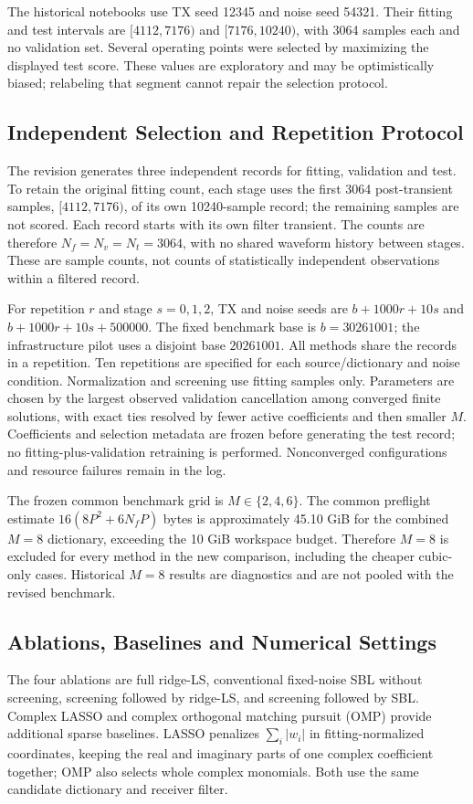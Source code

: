 \documentclass[conference]{IEEEtran}
\begin{document}
The historical notebooks use TX seed 12345 and noise seed 54321. Their fitting and test intervals are $[4112,7176)$ and $[7176,10240)$, with 3064 samples each and no validation set. Several operating points were selected by maximizing the displayed test score. These values are exploratory and may be optimistically biased; relabeling that segment cannot repair the selection protocol.

\subsection{Independent Selection and Repetition Protocol}\label{sec:selection}
The revision generates three independent records for fitting, validation and test. To retain the original fitting count, each stage uses the first 3064 post-transient samples, $[4112,7176)$, of its own 10240-sample record; the remaining samples are not scored. Each record starts with its own filter transient. The counts are therefore $N_f=N_v=N_t=3064$, with no shared waveform history between stages. These are sample counts, not counts of statistically independent observations within a filtered record.

For repetition $r$ and stage $s=0,1,2$, TX and noise seeds are $b+1000r+10s$ and $b+1000r+10s+500000$. The fixed benchmark base is $b=30261001$; the infrastructure pilot uses a disjoint base $20261001$. All methods share the records in a repetition. Ten repetitions are specified for each source/dictionary and noise condition. Normalization and screening use fitting samples only. Parameters are chosen by the largest observed validation cancellation among converged finite solutions, with exact ties resolved by fewer active coefficients and then smaller $M$. Coefficients and selection metadata are frozen before generating the test record; no fitting-plus-validation retraining is performed. Nonconverged configurations and resource failures remain in the log.

The frozen common benchmark grid is $M\in\{2,4,6\}$. The common preflight estimate $16(8P^2+6N_fP)$ bytes is approximately 45.10 GiB for the combined $M=8$ dictionary, exceeding the 10 GiB workspace budget. Therefore $M=8$ is excluded for every method in the new comparison, including the cheaper cubic-only cases. Historical $M=8$ results are diagnostics and are not pooled with the revised benchmark.

\subsection{Ablations, Baselines and Numerical Settings}
The four ablations are full ridge-LS, conventional fixed-noise SBL without screening, screening followed by ridge-LS, and screening followed by SBL. Complex LASSO and complex orthogonal matching pursuit (OMP) provide additional sparse baselines. LASSO penalizes $\sum_i|w_i|$ in fitting-normalized coordinates, keeping the real and imaginary parts of one complex coefficient together; OMP also selects whole complex monomials. Both use the same candidate dictionary and receiver filter.
\end{document}
